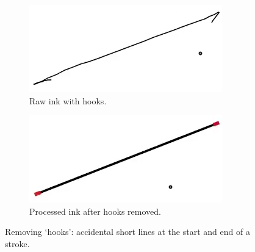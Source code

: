 \begin{figure}
  \centering
  \begin{subfigure}[t]{0.42\textwidth}
    \includegraphics[width=\linewidth]{img/hook-1.png}
    \caption{Raw ink with hooks.}
    \label{fig:hook-1}
  \end{subfigure}
  \hspace{1cm} %
  \begin{subfigure}[t]{0.42\textwidth}
    \includegraphics[width=\linewidth]{img/hook-2.png}
    \caption{Processed ink after hooks removed.}
    \label{fig:hook-2}
  \end{subfigure}
  \caption[Hook removal]{Removing `hooks': accidental short lines at
    the start and end of a stroke.}
  \label{fig:hooks}
\end{figure}
